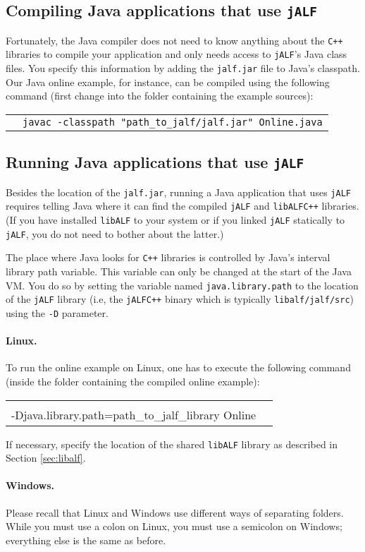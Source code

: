 \documentclass[a4paper, fontsize=11pt, DIV=12, parskip=half]{scrartcl}
\newcommand{\libalf}{\texttt{libALF}\xspace}
\newcommand{\jalf}{\texttt{jALF}\xspace}
\newcommand{\cpp}{\texttt{C+$\!$+}\xspace}
\newcommand{\cmd}[1]{
\begin{tabular}{p{.025\textwidth}l}
&\begin{minipage}{.85\textwidth}\texttt{#1}\end{minipage}
\end{tabular}
}
\begin{document}
\subsection{Compiling Java applications that use \jalf}
Fortunately, the Java compiler does not need to know anything about the \cpp libraries to compile your application and only needs access to \jalf's Java class files. You specify this information by adding the \texttt{jalf.jar} file to Java's classpath. Our Java online example, for instance, can be compiled using the following command (first change into the folder containing the example sources):

\cmd{javac -classpath "path\_to\_jalf/jalf.jar" Online.java}

\subsection{Running Java applications that use \jalf}
Besides the location of the \texttt{jalf.jar}, running a Java application that uses \jalf requires telling Java where it can find the compiled \jalf and \libalf \cpp libraries. (If you have installed \libalf to your system or if you linked \jalf statically to \jalf, you do not need to bother about the latter.)

The place where Java looks for \cpp libraries is controlled by Java's interval library path variable. This variable can only be changed at the start of the Java VM. You do so by setting the variable named \texttt{java.library.path} to the location of the \jalf library (i.e, the \jalf \cpp binary which is typically \texttt{libalf/jalf/src}) using the \texttt{-D} parameter. 

\paragraph{Linux.}
To run the online example on Linux, one has to execute the following command (inside the folder containing the compiled online example):

\cmd{java -classpath "path\_to\_jalf/jalf.jar:." \\\phantom{java }-Djava.library.path=path\_to\_jalf\_library Online}

If necessary, specify the location of the shared \libalf library as described in Section \ref{sec:libalf}.

\paragraph{Windows.}
Please recall that Linux and Windows use different ways of separating folders. While you must use a colon on Linux, you must use a semicolon on Windows; everything else is the same as before.
\end{document}
